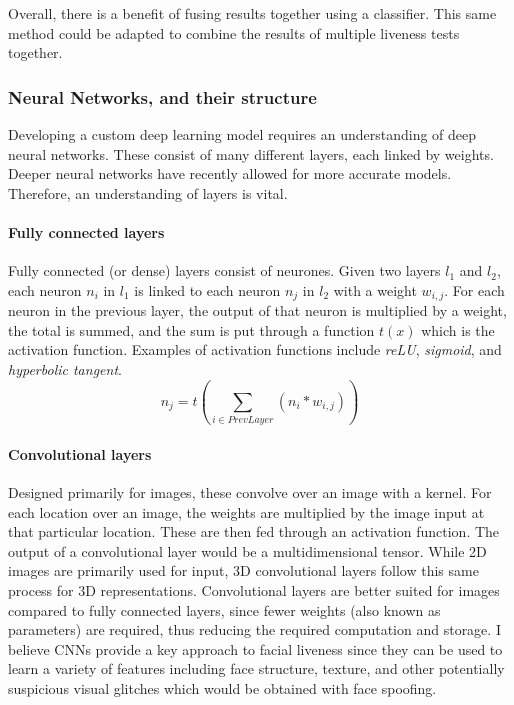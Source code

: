 \documentclass[10pt,a4paper]{article}
\begin{document}
        Overall, there is a benefit of fusing results together using a classifier. This same method could be adapted to combine the results of multiple liveness tests together.


        \subsubsection{Neural Networks, and their structure}
        Developing a custom deep learning model requires an understanding of deep neural networks. These consist of many different layers, each linked by weights. Deeper neural networks have recently allowed for more accurate models. Therefore, an understanding of layers is vital.

        \paragraph{Fully connected layers} Fully connected (or dense) layers consist of neurones. Given two layers $l_1$ and $l_2$, each
        neuron $n_i$ in $l_1$ is linked to each neuron $n_j$ in $l_2$ with a weight $w_{i, j}$. For each neuron in the previous layer, the output of that neuron is multiplied by a weight, the total is summed,
        and the sum is put through a function $t(x)$ which is the activation function. Examples of activation functions include \emph{reLU}, \emph{sigmoid}, and \emph{hyperbolic tangent}.
        $$n_j = t(\sum_{i \in PrevLayer}(n_i * w_{i, j}))$$

        \paragraph{Convolutional layers} Designed primarily for images, these convolve over an image with a kernel. For each location over an image, the weights are multiplied by the image input at that particular location. These are then fed through an activation function.
        The output of a convolutional layer would be a multidimensional tensor. While 2D images are primarily used for input, 3D convolutional layers follow this same process for 3D representations. 
        Convolutional layers are better suited for images compared to fully connected layers, since fewer weights (also known as parameters) are required, thus reducing the required computation and storage. I believe CNNs provide a key approach to facial liveness since they can be used to learn a variety of features including face structure,
        texture, and other potentially suspicious visual glitches which would be obtained with face spoofing.
\end{document}

